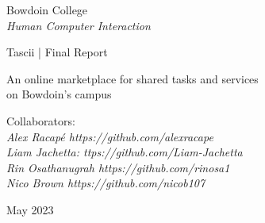 \thispagestyle{empty}

\begin{center}

    \vspace{20pt}

    Bowdoin College \\ 
    \textit{Human Computer Interaction}

    \vspace{20pt}

    
\end{center}

\vfill

\begin{center}
    \huge{Tascii | Final Report} \\  
    
    \vspace{20pt}

    \normalsize {An online marketplace for shared tasks and services \\ on Bowdoin's campus}
    \textit{}

    \vspace{20pt}

    
\end{center}

\vfill

    \noindent Collaborators: \\
    \textit{Alex Racapé  \hfill https://github.com/alexracape}\\ 
    \textit{ Liam Jachetta: \hfill ttps://github.com/Liam-Jachetta} \\ 
    \textit{Rin Osathanugrah \hfill https://github.com/rinosa1} \\
    \textit{Nico Brown \hfill https://github.com/nicob107} \\

    \vspace{20pt}





\begin{center}
    May 2023
\end{center}